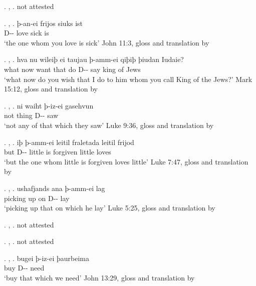 \ex. , 
\a. not attested

\ex. , 
\ag. þ-an-ei frijos siuks ist\\
 D-- love\scsub{[acc]} sick is\scsub{[nom]}\\
 `the one whom you love is sick' \hfill John 11:3, gloss and translation by \citealt[342]{harbert1978}

 \ex. , 
 \ag. hva nu wileiþ ei taujau þ-amm-ei qiþiþ þiudan Iudaie?\\
 what now want that do\scsub{[dat]} D-- say\scsub{[acc]} king {of Jews}\\
 `what now do you wish that I do to him whom you call King of the Jews?' \hfill Mark 15:12, gloss and translation by \citealt[339]{harbert1978}

 \ex. , 
 \ag. ni waiht þ-iz-ei gasehvun\\
  not thing\scsub{[gen]} D-- saw\scsub{[acc]}\\
  `not any of that which they saw' \hfill Luke 9:36, gloss and translation by \citealt[340]{harbert1978}

\ex. , 
\ag. iþ þ-amm-ei leitil fraletada leitil frijod\\
but D-- little {is forgiven\scsub{[dat]}} little loves\scsub{[nom]}\\
`but the one whom little is forgiven loves little' \hfill Luke 7:47, gloss and translation by \citealt[342]{harbert1978}

\ex. , 
\ag. ushafjands ana þ-amm-ei lag\\
picking up on\scsub{[acc]} D-- lay\scsub{[dat]}\\
`picking up that on which he lay' \hfill Luke 5:25, gloss and translation by \citealt[343]{harbert1978}

\ex. , 
\a. not attested

\ex.  , 
\a. not attested

\ex. , 
\ag. bugei þ-iz-ei þaurbeima\\
 buy\scsub{[acc]} D-- need\scsub{[gen]}\\
 `buy that which we need' \hfill John 13:29, gloss and translation by \citealt[343]{harbert1978}

